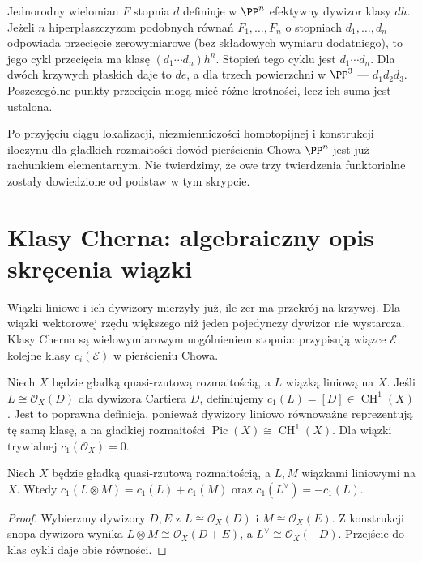 \begin{przyklad}
\label{prz:ga7-bezout}
Jednorodny wielomian $F$ stopnia $d$ definiuje w
$\PP^n$ efektywny dywizor klasy $d h$.
Jeżeli $n$ hiperpłaszczyzom podobnych równań
$F_1,\ldots,F_n$ o stopniach $d_1,\ldots,d_n$
odpowiada przecięcie zerowymiarowe (bez składowych
wymiaru dodatniego), to jego cykl przecięcia ma klasę
$(d_1\cdots d_n)h^n$. Stopień tego cyklu jest
$d_1\cdots d_n$. Dla dwóch krzywych płaskich daje to
$de$, a dla trzech powierzchni w $\PP^3$ --- $d_1d_2d_3$.
Poszczególne punkty przecięcia mogą mieć różne krotności,
lecz ich suma jest ustalona.
\end{przyklad}

\begin{uwaga}
Po przyjęciu ciągu lokalizacji, niezmienniczości
homotopijnej i konstrukcji iloczynu dla gładkich
rozmaitości dowód pierścienia Chowa $\PP^n$ jest
już rachunkiem elementarnym. Nie twierdzimy, że
owe trzy twierdzenia funktorialne zostały dowiedzione
od podstaw w tym skrypcie.
\end{uwaga}

\section{Klasy Cherna: algebraiczny opis skręcenia wiązki}
\label{sec:ga7-chern}

Wiązki liniowe i ich dywizory mierzyły już, ile zer
ma przekrój na krzywej. Dla wiązki wektorowej rzędu
większego niż jeden pojedynczy dywizor nie wystarcza.
Klasy Cherna są wielowymiarowym uogólnieniem stopnia:
przypisują wiązce $\mathcal E$ kolejne klasy
$c_i(\mathcal E)$ w pierścieniu Chowa.

\begin{definicja}
\label{def:ga7-c1}
Niech $X$ będzie gładką quasi-rzutową rozmaitością,
a $L$ wiązką liniową na $X$. Jeśli $L\cong\mathcal O_X(D)$
dla dywizora Cartiera $D$, definiujemy
$c_1(L)=[D]\in\operatorname{CH}^1(X)$.
Jest to poprawna definicja, ponieważ dywizory liniowo
równoważne reprezentują tę samą klasę, a na gładkiej
rozmaitości $\operatorname{Pic}(X)\cong\operatorname{CH}^1(X)$.
Dla wiązki trywialnej $c_1(\mathcal O_X)=0$.
\end{definicja}

\begin{stwierdzenie}
\label{st:ga7-c1-add}
Niech $X$ będzie gładką quasi-rzutową rozmaitością,
a $L,M$ wiązkami liniowymi na $X$. Wtedy
$c_1(L\otimes M)=c_1(L)+c_1(M)$ oraz
$c_1(L^\vee)=-c_1(L)$.
\end{stwierdzenie}
\begin{proof}
Wybierzmy dywizory $D,E$ z $L\cong\mathcal O_X(D)$
i $M\cong\mathcal O_X(E)$. Z konstrukcji snopa dywizora
wynika $L\otimes M\cong\mathcal O_X(D+E)$, a
$L^\vee\cong\mathcal O_X(-D)$.
Przejście do klas cykli daje obie równości.
\end{proof}

